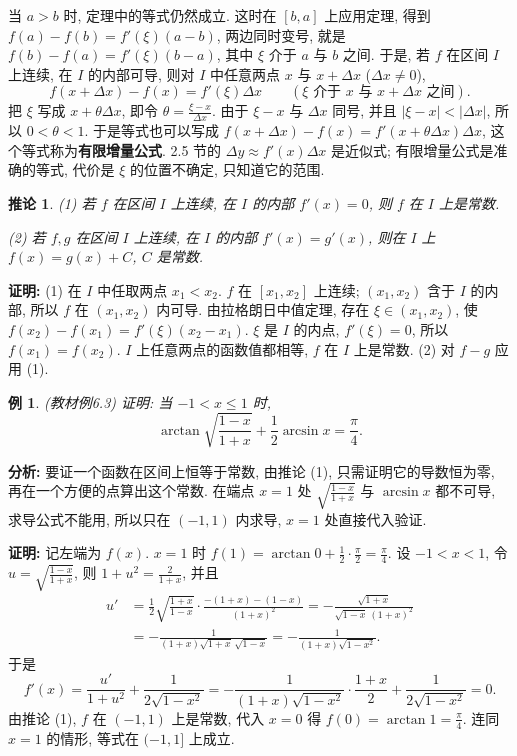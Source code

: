 \documentclass[UTF8,openany]{ctexbook}
\theoremstyle{chinesetextbook}
\newtheorem{example}{例}[section]
\newenvironment{cnproof}{\par\indent\textbf{证明:} \ignorespaces}{\par}
\newtheorem*{corollarysingle}{推论}
\begin{document}
当 $a>b$ 时, 定理中的等式仍然成立. 这时在 $[b,a]$ 上应用定理, 得到 $f(a)-f(b)=f'(\xi)(a-b)$, 两边同时变号, 就是 $f(b)-f(a)=f'(\xi)(b-a)$, 其中 $\xi$ 介于 $a$ 与 $b$ 之间. 于是, 若 $f$ 在区间 $I$ 上连续, 在 $I$ 的内部可导, 则对 $I$ 中任意两点 $x$ 与 $x+\Delta x$ ($\Delta x\ne0$),
\[
f(x+\Delta x)-f(x)=f'(\xi)\Delta x\qquad(\xi\text{ 介于 }x\text{ 与 }x+\Delta x\text{ 之间}).
\]
把 $\xi$ 写成 $x+\theta\Delta x$, 即令 $\displaystyle\theta=\frac{\xi-x}{\Delta x}$. 由于 $\xi-x$ 与 $\Delta x$ 同号, 并且 $|\xi-x|<|\Delta x|$, 所以 $0<\theta<1$. 于是等式也可以写成 $f(x+\Delta x)-f(x)=f'(x+\theta\Delta x)\Delta x$, 这个等式称为\textbf{有限增量公式}. 2.5 节的 $\Delta y\approx f'(x)\Delta x$ 是近似式; 有限增量公式是准确的等式, 代价是 $\xi$ 的位置不确定, 只知道它的范围.
\begin{corollarysingle}
\textup{(1)} 若 $f$ 在区间 $I$ 上连续, 在 $I$ 的内部 $f'(x)=0$, 则 $f$ 在 $I$ 上是常数.

\textup{(2)} 若 $f,g$ 在区间 $I$ 上连续, 在 $I$ 的内部 $f'(x)=g'(x)$, 则在 $I$ 上 $f(x)=g(x)+C$, $C$ 是常数.
\end{corollarysingle}
\begin{cnproof}
(1) 在 $I$ 中任取两点 $x_1<x_2$. $f$ 在 $[x_1,x_2]$ 上连续; $(x_1,x_2)$ 含于 $I$ 的内部, 所以 $f$ 在 $(x_1,x_2)$ 内可导. 由拉格朗日中值定理, 存在 $\xi\in(x_1,x_2)$, 使 $f(x_2)-f(x_1)=f'(\xi)(x_2-x_1)$. $\xi$ 是 $I$ 的内点, $f'(\xi)=0$, 所以 $f(x_1)=f(x_2)$. $I$ 上任意两点的函数值都相等, $f$ 在 $I$ 上是常数. (2) 对 $f-g$ 应用 (1).
\end{cnproof}
\begin{example}\label{ex:c2-6-3}
\textnormal{(教材例6.3)} 证明: 当 $-1<x\le1$ 时,
\[
\arctan\sqrt{\frac{1-x}{1+x}}+\frac12\arcsin x=\frac\pi4.
\]
\end{example}
\par\indent\textbf{分析:} 要证一个函数在区间上恒等于常数, 由推论 (1), 只需证明它的导数恒为零, 再在一个方便的点算出这个常数. 在端点 $x=1$ 处 $\displaystyle\sqrt{\frac{1-x}{1+x}}$ 与 $\arcsin x$ 都不可导, 求导公式不能用, 所以只在 $(-1,1)$ 内求导, $x=1$ 处直接代入验证.
\begin{cnproof}
记左端为 $f(x)$. $x=1$ 时 $\displaystyle f(1)=\arctan0+\frac12\cdot\frac\pi2=\frac\pi4$. 设 $-1<x<1$, 令 $\displaystyle u=\sqrt{\frac{1-x}{1+x}}$, 则 $\displaystyle1+u^2=\frac2{1+x}$, 并且
\[
\begin{aligned}
u'&=\frac12\sqrt{\frac{1+x}{1-x}}\cdot\frac{-(1+x)-(1-x)}{(1+x)^2}=-\frac{\sqrt{1+x}}{\sqrt{1-x}\,(1+x)^2}\\
&=-\frac1{(1+x)\sqrt{1+x}\,\sqrt{1-x}}=-\frac1{(1+x)\sqrt{1-x^2}}.
\end{aligned}
\]
于是
\[
f'(x)=\frac{u'}{1+u^2}+\frac1{2\sqrt{1-x^2}}=-\frac1{(1+x)\sqrt{1-x^2}}\cdot\frac{1+x}2+\frac1{2\sqrt{1-x^2}}=0.
\]
由推论 (1), $f$ 在 $(-1,1)$ 上是常数, 代入 $x=0$ 得 $\displaystyle f(0)=\arctan1=\frac\pi4$. 连同 $x=1$ 的情形, 等式在 $(-1,1]$ 上成立.
\end{cnproof}
\end{document}
